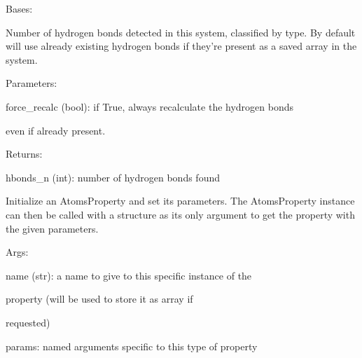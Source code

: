 \documentclass[letterpaper,10pt,english]{sphinxmanual}
\begin{document}
\begin{fulllineitems}
\label{doctree/soprano.properties.linkage.linkage:soprano.properties.linkage.linkage.HydrogenBondsNumber}
Bases: {\hyperref[doctree/soprano.properties.atomsproperty:soprano.properties.atomsproperty.AtomsProperty]{}}

Number of hydrogen bonds detected in this system, classified by type.
By default will use already existing hydrogen bonds if they're present as
a saved array in the system.

\begin{DUlineblock}{0em}
\item[] Parameters:
\item[]
\begin{DUlineblock}{\DUlineblockindent}
\item[] force\_recalc (bool): if True, always recalculate the hydrogen bonds
\item[]
\begin{DUlineblock}{\DUlineblockindent}
\item[] even if already present.
\end{DUlineblock}
\end{DUlineblock}
\end{DUlineblock}

\begin{DUlineblock}{0em}
\item[] Returns:
\item[]
\begin{DUlineblock}{\DUlineblockindent}
\item[] hbonds\_n (int): number of hydrogen bonds found
\end{DUlineblock}
\end{DUlineblock}

Initialize an AtomsProperty and set its parameters.
The AtomsProperty instance can then be called with a structure as its
only argument to get the property with the given parameters.

\begin{DUlineblock}{0em}
\item[] Args:
\item[]
\begin{DUlineblock}{\DUlineblockindent}
\item[] name (str): a name to give to this specific instance of the
\item[]
\begin{DUlineblock}{\DUlineblockindent}
\item[] property (will be used to store it as array if
\item[] requested)
\end{DUlineblock}
\item[] params: named arguments specific to this type of property
\end{DUlineblock}
\end{DUlineblock}


\end{fulllineitems}
\end{document}
